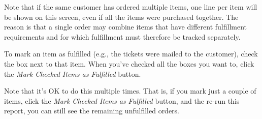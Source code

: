 Note that if the same customer has ordered multiple items, one line per
item will be shown on this screen, even if all the items were purchased
together. The reason is that a single order may combine items that have
different fulfillment requirements and for which fulfillment must
therefore be tracked separately.

To mark an item as fulfilled (e.g., the tickets were mailed to the
customer), check the box next to that item.  When you've checked all the
boxes you want to, click the \emph{Mark Checked Items as Fulfilled}
button.

Note that it's OK to do this multiple times.  That is, if you mark just
a couple of items, click the \emph{Mark Checked Items as Fulfilled}
button, and the re-run this report, you can still see the remaining
unfulfilled orders.
